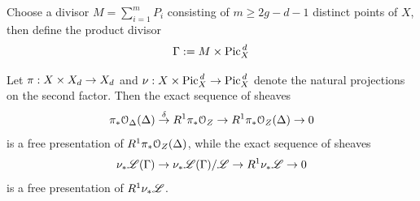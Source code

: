 		\begin{defi}\label{def:Gamma}
			Choose a divisor $M = \sum_{i=1}^m P_i$ consisting of $m \geq 2g-d-1$ distinct points of $X$, then define the product divisor 
			$$\Gamma := M\times \operatorname{Pic}^{\,d}_X$$
		\end{defi}	


		\begin{prop}\label{prop:free_pres}
			Let $\pi : X\times X_d \to X_d$ and $\nu : X\times \operatorname{Pic}^{\,d}_X \to \operatorname{Pic}^{\,d}_X$ denote the natural projections on the second factor. Then the exact sequence of sheaves
			\begin{equation}\label{eq:univ_div_seq}
				\pi_* \mathcal{O}_{\Delta}(\Delta)\overset{\delta}\to R^1 \pi_* \mathcal{O}_Z \to R^1 \pi_* \mathcal{O}_Z(\Delta) \to 0
			\end{equation}
			is a free presentation of $R^1 \pi_* \mathcal{O}_Z(\Delta)$, while the exact sequence of sheaves
			\begin{equation}\label{eq:univ_lb_seq}
				\nu_{*} \mathscr{L}(\Gamma)\to \nu_{*} \mathscr{L}(\Gamma) / \mathscr{L} \to R^1 \nu_{*} \mathscr{L} \to 0
			\end{equation}		
			is a free presentation of $R^1 \nu_{*} \mathscr{L}$.
		\end{prop}
